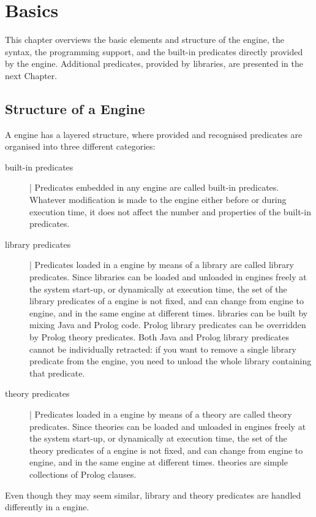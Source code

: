 \chapter{\tuprolog{} Basics}
\label{ch:engine}

This chapter overviews the basic elements and structure of the \tuprolog{} engine, the \tuprolog{} syntax, the programming support, and the built-in predicates directly provided by the engine.
%
Additional predicates, provided by libraries, are presented in the next Chapter.

\section{Structure of a \tuprolog{} Engine}

\noindent A \tuprolog{} engine has a layered structure, where provided and recognised predicates are organised into three different categories:
%
\begin{description}
\item[built-in predicates] |
Predicates embedded in any \tuprolog{} engine are called built-in predicates.
%
Whatever modification is made to the engine either before or during execution time, it does not affect the number and properties of the built-in predicates.
%
\item[library predicates] |
Predicates loaded in a \tuprolog{} engine by means of a \tuprolog{} library are called library predicates.
%
Since libraries can be loaded and unloaded in \tuprolog{} engines freely at the system start-up, or dynamically at execution time, the set of the library predicates of a \tuprolog{} engine is not fixed, and can change from engine to engine, and in the same engine at different times.
%
\tuprolog{} libraries can be built by mixing Java and Prolog code. Prolog
library predicates can be overridden by Prolog theory predicates. Both Java and
Prolog library predicates cannot be individually retracted: if you want to
remove a single library predicate from the engine, you need to unload the whole
library containing that predicate.
\item[theory predicates] |
Predicates loaded in a \tuprolog{} engine by means of a \tuprolog{} theory are called theory predicates.
%
Since theories can be loaded and unloaded in \tuprolog{} engines freely at the system start-up, or dynamically at execution time, the set of the theory predicates of a \tuprolog{} engine is not fixed, and can change from engine to engine, and in the same engine at different times.
%
\tuprolog{} theories are simple collections of Prolog clauses.
\end{description}
%
Even though they may seem similar, library and theory predicates are handled differently in a \tuprolog{} engine.

